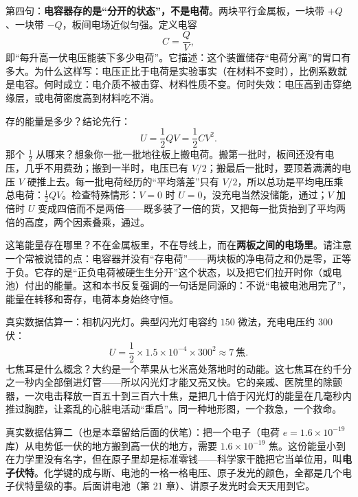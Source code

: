 \begin{mainline}
第四句：\textbf{电容器存的是“分开的状态”，不是电荷}。两块平行金属板，一块带 \(+Q\)、一块带 \(-Q\)，板间电场近似匀强。定义电容
\[
C = \frac{Q}{V},
\]
即“每升高一伏电压能装下多少电荷”。它描述：这个装置储存“电荷分离”的胃口有多大。为什么这样写：电压正比于电荷是实验事实（在材料不变时），比例系数就是电容。何时成立：电介质不被击穿、材料性质不变。何时失效：电压高到击穿绝缘层，或电荷密度高到材料吃不消。

存的能量是多少？结论先行：
\[
U = \frac{1}{2}QV = \frac{1}{2}CV^2 .
\]
那个 \(\frac{1}{2}\) 从哪来？想象你一批一批地往板上搬电荷。搬第一批时，板间还没有电压，几乎不用费劲；搬到一半时，电压已有 \(V/2\)；搬最后一批时，要顶着满满的电压 \(V\) 硬推上去。每一批电荷经历的“平均落差”只有 \(V/2\)，所以总功是平均电压乘总电荷：\(\frac{1}{2}QV\)。检查特殊情形：\(V=0\) 时 \(U=0\)，没充电当然没储能，通过；\(V\) 加倍时 \(U\) 变成四倍而不是两倍——既多装了一倍的货，又把每一批货抬到了平均两倍的高度，两个因素叠乘，通过。

这笔能量存在哪里？不在金属板里，不在导线上，而在\textbf{两板之间的电场里}。请注意一个常被说错的点：电容器并没有“存电荷”——两块板的净电荷之和仍是零，正等于负。它存的是“正负电荷被硬生生分开”这个状态，以及把它们拉开时你（或电池）付出的能量。这和本书反复强调的一句话是同源的：不说“电被电池用完了”，能量在转移和寄存，电荷本身始终守恒。

真实数据估算一：相机闪光灯。典型闪光灯电容约 \(150\) 微法，充电电压约 \(300\) 伏：
\[
U=\frac12\times 1.5\times10^{-4}\times 300^2 \approx 7\ \text{焦} .
\]
七焦耳是什么概念？大约是一个苹果从七米高处落地时的动能。这七焦耳在约千分之一秒内全部倒进灯管——所以闪光灯才能又亮又快。它的亲戚、医院里的除颤器，一次电击释放一百五十到三百六十焦，是把几十倍于闪光灯的能量在几毫秒内推过胸腔，让紊乱的心脏电活动“重启”。同一种地形图，一个救急，一个救命。

真实数据估算二（也是本章留给后面的伏笔）：把一个电子（电荷 \(e = 1.6\times10^{-19}\) 库）从电势低一伏的地方搬到高一伏的地方，需要 \(1.6\times10^{-19}\) 焦。这份能量小到在力学里没有名字，但在原子里却是标准零钱——科学家干脆把它当单位用，叫\textbf{电子伏特}。化学键的成与断、电池的一格一格电压、原子发光的颜色，全都是几个电子伏特量级的事。后面讲电池（第 21 章）、讲原子发光时会天天用到它。
\end{mainline}

